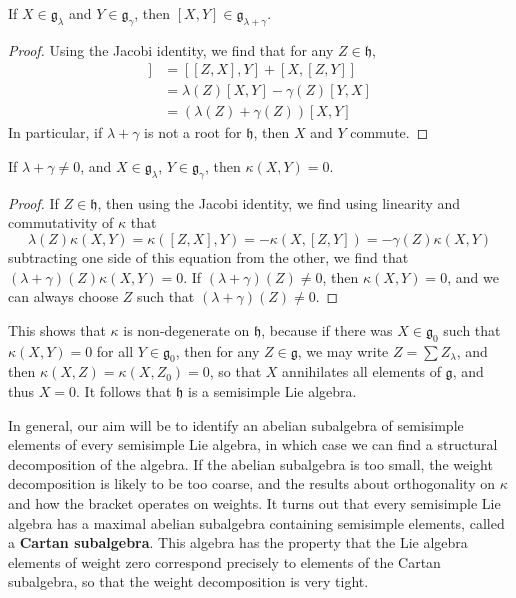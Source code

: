 \begin{theorem}
    If $X \in \mathfrak{g}_\lambda$ and $Y \in \mathfrak{g}_\gamma$, then $[X,Y] \in \mathfrak{g}_{\lambda + \gamma}$.
\end{theorem}
\begin{proof}
    Using the Jacobi identity, we find that for any $Z \in \mathfrak{h}$,
    \begin{align*}
        [Z,[X,Y]] &= [[Z,X],Y] + [X,[Z,Y]]\\
        &= \lambda(Z)[X,Y] - \gamma(Z)[Y,X]\\
        &= (\lambda(Z) + \gamma(Z))[X,Y]
    \end{align*}
    In particular, if $\lambda + \gamma$ is not a root for $\mathfrak{h}$, then $X$ and $Y$ commute.
\end{proof}

\begin{theorem}
    If $\lambda + \gamma \neq 0$, and $X \in \mathfrak{g}_\lambda$, $Y \in \mathfrak{g}_\gamma$, then $\kappa(X,Y) = 0$.
\end{theorem}
\begin{proof}
    If $Z \in \mathfrak{h}$, then using the Jacobi identity, we find using linearity and commutativity of $\kappa$ that
    \[ \lambda(Z) \kappa(X,Y) = \kappa([Z,X],Y) = -\kappa(X,[Z,Y]) = - \gamma(Z) \kappa(X,Y) \]
    subtracting one side of this equation from the other, we find that $(\lambda + \gamma)(Z) \kappa(X,Y) = 0$. If $(\lambda + \gamma)(Z) \neq 0$, then $\kappa(X,Y) = 0$, and we can always choose $Z$ such that $(\lambda + \gamma)(Z) \neq 0$.
\end{proof}

This shows that $\kappa$ is non-degenerate on $\mathfrak{h}$, because if there was $X \in \mathfrak{g}_0$ such that $\kappa(X,Y) = 0$ for all $Y \in \mathfrak{g}_0$, then for any $Z \in \mathfrak{g}$, we may write $Z = \sum Z_\lambda$, and then $\kappa(X,Z) = \kappa(X,Z_0) = 0$, so that $X$ annihilates all elements of $\mathfrak{g}$, and thus $X = 0$. It follows that $\mathfrak{h}$ is a semisimple Lie algebra.

In general, our aim will be to identify an abelian subalgebra of semisimple elements of every semisimple Lie algebra, in which case we can find a structural decomposition of the algebra. If the abelian subalgebra is too small, the weight decomposition is likely to be too coarse, and the results about orthogonality on $\kappa$ and how the bracket operates on weights. It turns out that every semisimple Lie algebra has a maximal abelian subalgebra containing semisimple elements, called a {\bf Cartan subalgebra}. This algebra has the property that the Lie algebra elements of weight zero correspond precisely to elements of the Cartan subalgebra, so that the weight decomposition is very tight.

